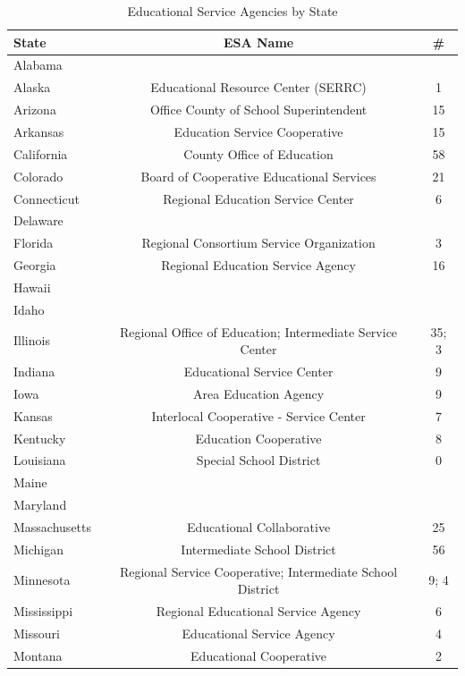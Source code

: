 \begin{table}
\footnotesize
\caption{\label{tab:si_tbl:esa_names_tbl}Educational Service Agencies by State}
\centering
\begin{tabular}[t]{|l|c|c|}
\hline
\textbf{State} & \textbf{ESA Name} & \textbf{\#}\\
\hline
Alabama &  & \\
\hline
Alaska & Educational Resource Center (SERRC) & 1\\
\hline
Arizona & Office County of School Superintendent & 15\\
\hline
Arkansas & Education Service Cooperative & 15\\
\hline
California & County Office of Education & 58\\
\hline
Colorado & Board of Cooperative Educational Services & 21\\
\hline
Connecticut & Regional Education Service Center & 6\\
\hline
Delaware &  & \\
\hline
Florida & Regional Consortium Service Organization & 3\\
\hline
Georgia & Regional Education Service Agency & 16\\
\hline
Hawaii &  & \\
\hline
Idaho &  & \\
\hline
Illinois & Regional Office of Education; Intermediate Service Center & 35; 3\\
\hline
Indiana & Educational Service Center & 9\\
\hline
Iowa & Area Education Agency & 9\\
\hline
Kansas & Interlocal Cooperative - Service Center & 7\\
\hline
Kentucky & Education Cooperative & 8\\
\hline
Louisiana & Special School District & 0\\
\hline
Maine &  & \\
\hline
Maryland &  & \\
\hline
Massachusetts & Educational Collaborative & 25\\
\hline
Michigan & Intermediate School District & 56\\
\hline
Minnesota & Regional Service Cooperative; Intermediate School District & 9; 4\\
\hline
Mississippi & Regional Educational Service Agency & 6\\
\hline
Missouri & Educational Service Agency & 4\\
\hline
Montana & Educational Cooperative & 2\\

\end{tabular}
\end{table}

